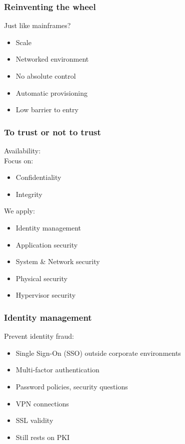 \documentclass{beamer}
\begin{document}
\begin{frame}
    \frametitle{Reinventing the wheel}
    Just like mainframes?
    \begin{itemize}
    \item Scale
    \item Networked environment
    \item No absolute control
    \item Automatic provisioning
    \item Low barrier to entry
    \end{itemize}
\end{frame}

\begin{frame}
    \frametitle{To trust or not to trust}

    Availability: \checkmark \\
    Focus on:
    \begin{itemize}
      \item Confidentiality
      \item Integrity
    \end{itemize}
    We apply:
    \begin{itemize} %
      \item Identity management
      \item Application security
      \item System \& Network security
      \item Physical security
      \item Hypervisor security %
    \end{itemize}
\end{frame}

\begin{frame}
    \frametitle{Identity management}
    Prevent identity fraud:
    \begin{itemize}
      \item Single Sign-On (SSO) outside corporate environments %
      \item Multi-factor authentication
      \item Password policies, security questions
      \item VPN connections
      \item SSL validity
      \item Still rests on PKI
    \end{itemize}
\end{frame}
\end{document}
